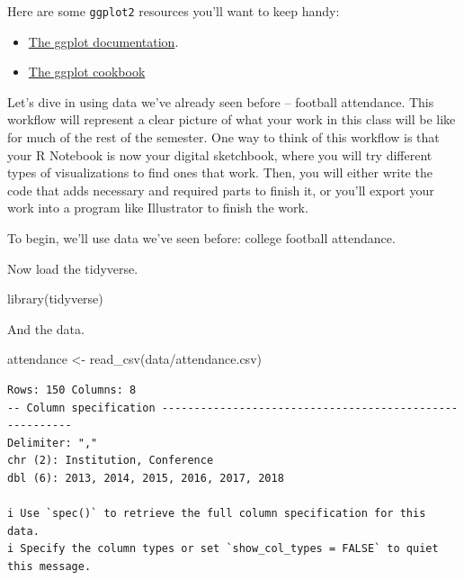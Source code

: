 \documentclass[
  letterpaper,
  DIV=11,
  numbers=noendperiod]{scrreprt}
\newenvironment{Shaded}{\begin{snugshade}}{\end{snugshade}}
\newcommand{\FunctionTok}[1]{\textcolor[rgb]{0.28,0.35,0.67}{#1}}
\newcommand{\NormalTok}[1]{\textcolor[rgb]{0.00,0.23,0.31}{#1}}
\newcommand{\OtherTok}[1]{\textcolor[rgb]{0.00,0.23,0.31}{#1}}
\newcommand{\StringTok}[1]{\textcolor[rgb]{0.13,0.47,0.30}{#1}}
\providecommand{\tightlist}{%
  \setlength{\itemsep}{0pt}\setlength{\parskip}{0pt}}\usepackage{longtable,booktabs,array}
\begin{document}
Here are some \texttt{ggplot2} resources you'll want to keep handy:

\begin{itemize}
\tightlist
\item
  \href{http://ggplot2.tidyverse.org/reference/index.html}{The ggplot
  documentation}.
\item
  \href{http://www.cookbook-r.com/Graphs/}{The ggplot cookbook}
\end{itemize}

Let's dive in using data we've already seen before -- football
attendance. This workflow will represent a clear picture of what your
work in this class will be like for much of the rest of the semester.
One way to think of this workflow is that your R Notebook is now your
digital sketchbook, where you will try different types of visualizations
to find ones that work. Then, you will either write the code that adds
necessary and required parts to finish it, or you'll export your work
into a program like Illustrator to finish the work.

To begin, we'll use data we've seen before: college football attendance.

Now load the tidyverse.

\begin{Shaded}
\begin{Highlighting}[]
\FunctionTok{library}\NormalTok{(tidyverse)}
\end{Highlighting}
\end{Shaded}

And the data.

\begin{Shaded}
\begin{Highlighting}[]
\NormalTok{attendance }\OtherTok{\textless{}{-}} \FunctionTok{read\_csv}\NormalTok{(}\StringTok{\textquotesingle{}data/attendance.csv\textquotesingle{}}\NormalTok{)}
\end{Highlighting}
\end{Shaded}

\begin{verbatim}
Rows: 150 Columns: 8
-- Column specification --------------------------------------------------------
Delimiter: ","
chr (2): Institution, Conference
dbl (6): 2013, 2014, 2015, 2016, 2017, 2018

i Use `spec()` to retrieve the full column specification for this data.
i Specify the column types or set `show_col_types = FALSE` to quiet this message.
\end{verbatim}
\end{document}
